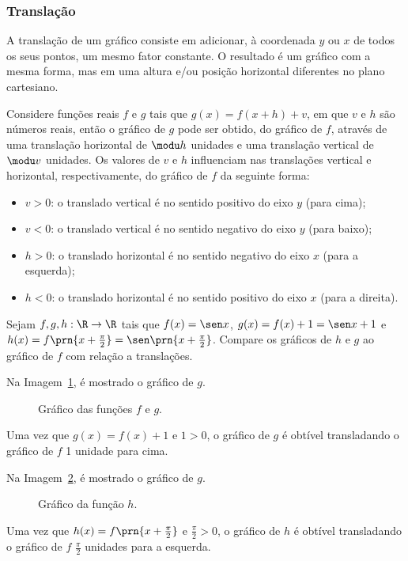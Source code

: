 \subsubsection{Translação}

A translação de um gráfico consiste em adicionar, à coordenada $y$ ou $x$ de todos os seus pontos, um mesmo fator constante.
O resultado é um gráfico com a mesma forma, mas em uma altura e/ou posição horizontal diferentes no plano cartesiano.

Considere funções reais $f$ e $g$ tais que $g(x) = f(x+h) + v$, em que $v$ e $h$ são números reais,
então o gráfico de $g$ pode ser obtido, do gráfico de $f$, através
de uma translação horizontal de $\modu h$ unidades e uma
translação vertical de $\modu v$ unidades.
Os valores de $v$ e $h$ influenciam nas translações vertical e horizontal, respectivamente, do gráfico de $f$ da seguinte forma:

\begin{itemize}
  \item $v > 0$: o translado vertical é no sentido positivo do eixo $y$ (para cima);
  \item $v < 0$: o translado vertical é no sentido negativo do eixo $y$ (para baixo);
  \item $h > 0$: o translado horizontal é no sentido negativo do eixo $x$ (para a esquerda);
  \item $h < 0$: o translado horizontal é no sentido positivo do eixo $x$ (para a direita).
\end{itemize}

\begin{example}
Sejam $f,g,h:\R \to \R$ tais que $f(x) = \sen x$, $g(x) = f(x) + 1 = \sen x +1$ e $h(x)= f\prn{x+\frac {\pi} 2}= \sen \prn{x+ \frac {\pi} 2}$.
Compare os gráficos de $h$ e $g$ ao gráfico de $f$ com relação a translações.
\end{example}

\begin{solution}
Na Imagem~\ref{img:grafico-translacao-exemplo-g}, é mostrado o gráfico de $g$.
%
  \begin{figure}
    \centering
    \caption{Gráfico das funções $f$ e $g$.}
    \label{img:grafico-translacao-exemplo-g}
  \end{figure}
%
\noindent Uma vez que $g(x) = f(x)+1$ e $1>0$, o gráfico de $g$ é obtível transladando o gráfico de $f$ 1 unidade para cima.

Na Imagem~\ref{img:grafico-translacao-exemplo-h}, é mostrado o gráfico de $g$.
%
  \begin{figure}
    \centering
    \caption{Gráfico da função $h$.}
    \label{img:grafico-translacao-exemplo-h}
  \end{figure}
%
\noindent Uma vez que $h(x) = f\prn{x+\frac {\pi} 2}$ e $\frac {\pi} 2>0$, o gráfico de $h$ é obtível transladando o gráfico de $f$ $\frac {\pi} 2$ unidades para a esquerda.
\end{solution}    